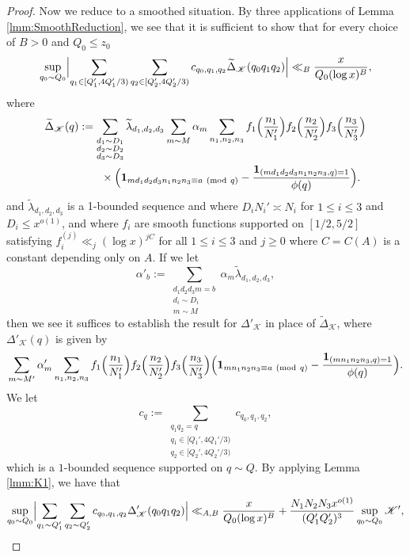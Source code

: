 \documentclass[10pt]{amsart}
\theoremstyle{plain}
\numberwithin{equation}{section}
\newcommand{\Mod}[1]{\ (\mathrm{mod}\ #1)}
\begin{document}
\begin{proof}
Now we reduce to a smoothed situation. By three applications of Lemma \ref{lmm:SmoothReduction}, we see that it is sufficient to show that for every choice of $B>0$ and $Q_0\le z_0$
\[
\sup_{\substack{q_0\sim Q_0}}\Bigl|\sum_{q_1\in[Q_1',4Q_1'/3)}\sum_{q_2\in[Q_2',4Q_2'/3)}c_{q_0,q_1,q_2}\widetilde{\Delta}_{\mathscr{K}}(q_0 q_1 q_2)\Bigr|\ll_B \frac{x}{Q_0(\log{x})^B},
\]
where
\begin{align*}
\widetilde{\Delta}_{\mathscr{K}}(q)&:=\sum_{\substack{d_1\sim D_1\\ d_2\sim D_2\\ d_3\sim D_3}}\widetilde{\lambda}_{d_1,d_2,d_3}\sum_{m\sim M}\alpha_m\sum_{\substack{n_1,n_2,n_3}}f_1\Bigl(\frac{n_1}{N_1'}\Bigr)f_2\Bigl(\frac{n_2}{N_2'}\Bigr)f_3\Bigl(\frac{n_3}{N_3'}\Bigr)\\
&\qquad \times\Bigl(\mathbf{1}_ {m d_1d_2d_3 n_1n_2n_3\equiv a\Mod{q}}-\frac{\mathbf{1}_{(md_1d_2d_3 n_1 n_2 n_3,q)=1}}{\phi(q)}\Bigr).
\end{align*}
and $\tilde{\lambda}_{d_1,d_2,d_3}$ is a 1-bounded sequence and where $D_iN_i'\asymp N_i$ for $1\le i\le 3$ and $D_i\le x^{o(1)}$, and where $f_i$ are smooth functions supported on $[1/2,5/2]$ satisfying $f_i^{(j)}\ll_j (\log{x})^{jC}$ for all $1\le i\le 3$ and $j\ge 0$ where $C=C(A)$ is a constant depending only on $A$. If we let 
\[
\alpha'_{b}:=\sum_{\substack{d_1d_2d_3m=b\\ d_i\sim D_i\\ m\sim M}}\alpha_m\widetilde{\lambda}_{d_1,d_2,d_3},
\]
then we see it suffices to establish the result for $\Delta'_{\mathscr{K}}$ in place of $\widetilde{\Delta}_{\mathscr{K}}$, where $\Delta'_{\mathscr{K}}(q)$ is given by
\begin{align*}
\sum_{m\sim M'}\alpha'_{m}\sum_{\substack{n_1,n_2,n_3}}f_1\Bigl(\frac{n_1}{N_1'}\Bigr)f_2\Bigl(\frac{n_2}{N_2'}\Bigr)f_3\Bigl(\frac{n_3}{N_3'}\Bigr)\Bigl(\mathbf{1}_ {m n_1n_2n_3\equiv a\Mod{q}}-\frac{\mathbf{1}_{(m n_1 n_2 n_3,q)=1}}{\phi(q)}\Bigr).
\end{align*}
We let
\[
c_q:=\sum_{\substack{q_1q_2=q\\ q_1\in[Q_1',4Q_1'/3)\\ q_2\in[Q_2',4Q_2'/3)}}c_{q_0,q_1,q_2},
\]
which is a $1$-bounded sequence supported on $q\sim Q$. By applying Lemma \ref{lmm:K1}, we have that
\[
\sup_{\substack{q_0\sim Q_0}}\Bigl|\sum_{q_1\sim Q_1'}\sum_{q_2\sim Q_2'}c_{q_0,q_1,q_2}\Delta'_{\mathscr{K}}(q_0 q_1 q_2)\Bigr|\ll_{A,B} \frac{x}{Q_0(\log{x})^B}+\frac{N_1 N_2 N_3 x^{o(1)}}{(Q_1'Q_2')^3}\sup_{q_0\sim Q_0}\mathscr{K}',
\]
\end{proof}
\end{document}
